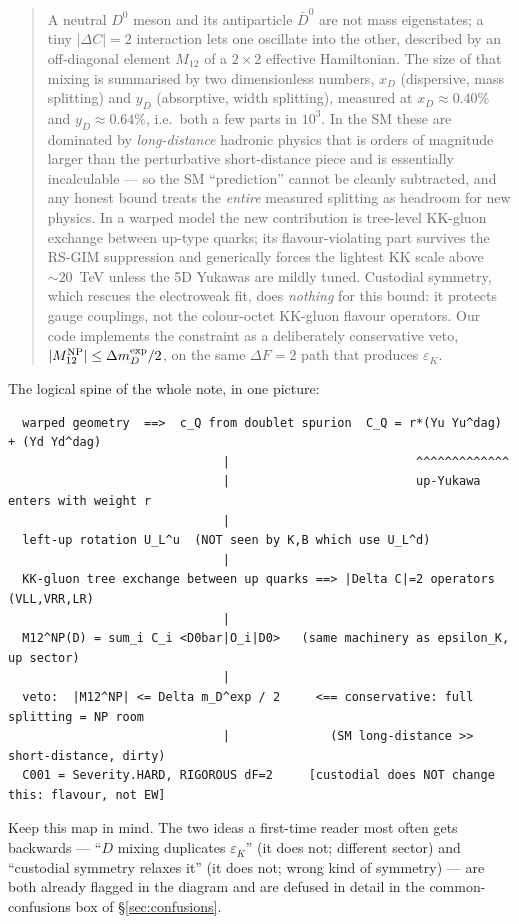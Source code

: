 \documentclass[11pt]{article}
\newcommand{\eps}{\varepsilon}
\newcommand{\Dz}{D^0}
\newcommand{\Dzbar}{\bar D^0}
\newcommand{\xD}{x_D}
\newcommand{\yD}{y_D}
\newcommand{\Mtwelve}{M_{12}}
\newcommand{\dmD}{\Delta m_D}
\theoremstyle{definition}
\begin{document}
\begin{quote}
\small
A neutral $\Dz$ meson and its antiparticle $\Dzbar$ are not mass eigenstates;
a tiny $|\Delta C|=2$ interaction lets one oscillate into the other, described
by an off-diagonal element $\Mtwelve$ of a $2\times2$ effective Hamiltonian. The
size of that mixing is summarised by two dimensionless numbers, $\xD$
(dispersive, mass splitting) and $\yD$ (absorptive, width splitting), measured
at $\xD\approx0.40\%$ and $\yD\approx0.64\%$, i.e.\ both a few parts in
$10^{3}$. In the SM these are dominated by
\emph{long-distance} hadronic physics that is orders of magnitude larger than
the perturbative short-distance piece and is essentially incalculable --- so the
SM ``prediction'' cannot be cleanly subtracted, and any honest bound treats the
\emph{entire} measured splitting as headroom for new physics. In a warped model
the new contribution is tree-level KK-gluon exchange between up-type quarks; its
flavour-violating part survives the RS-GIM suppression and generically forces the
lightest KK scale above ${\sim}20$~TeV unless the 5D Yukawas are mildly tuned.
Custodial symmetry, which rescues the electroweak fit, does \emph{nothing} for
this bound: it protects gauge couplings, not the colour-octet KK-gluon flavour
operators. Our code implements the constraint as a deliberately conservative
veto, $|\Mtwelve^{\rm NP}| \le \dmD^{\rm exp}/2$, on the same $\Delta F=2$ path
that produces $\eps_K$.
\end{quote}

\noindent The logical spine of the whole note, in one picture:
\begin{footnotesize}
\begin{verbatim}
  warped geometry  ==>  c_Q from doublet spurion  C_Q = r*(Yu Yu^dag) + (Yd Yd^dag)
                              |                          ^^^^^^^^^^^^^
                              |                          up-Yukawa enters with weight r
                              |
  left-up rotation U_L^u  (NOT seen by K,B which use U_L^d)
                              |
  KK-gluon tree exchange between up quarks ==> |Delta C|=2 operators (VLL,VRR,LR)
                              |
  M12^NP(D) = sum_i C_i <D0bar|O_i|D0>   (same machinery as epsilon_K, up sector)
                              |
  veto:  |M12^NP| <= Delta m_D^exp / 2     <== conservative: full splitting = NP room
                              |              (SM long-distance >> short-distance, dirty)
  C001 = Severity.HARD, RIGOROUS dF=2     [custodial does NOT change this: flavour, not EW]
\end{verbatim}
\end{footnotesize}
\noindent Keep this map in mind. The two ideas a first-time reader most often
gets backwards --- ``$D$ mixing duplicates $\eps_K$'' (it does not; different
sector) and ``custodial symmetry relaxes it'' (it does not; wrong kind of
symmetry) --- are both already flagged in the diagram and are defused in detail
in the common-confusions box of \S\ref{sec:confusions}.
\end{document}
